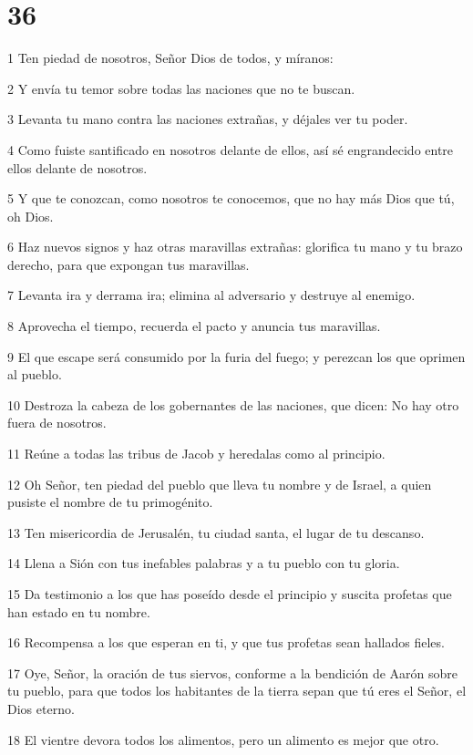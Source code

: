 \chapter{36}

\par 1 Ten piedad de nosotros, Señor Dios de todos, y míranos:
\par 2 Y envía tu temor sobre todas las naciones que no te buscan.
\par 3 Levanta tu mano contra las naciones extrañas, y déjales ver tu poder.
\par 4 Como fuiste santificado en nosotros delante de ellos, así sé engrandecido entre ellos delante de nosotros.
\par 5 Y que te conozcan, como nosotros te conocemos, que no hay más Dios que tú, oh Dios.
\par 6 Haz nuevos signos y haz otras maravillas extrañas: glorifica tu mano y tu brazo derecho, para que expongan tus maravillas.
\par 7 Levanta ira y derrama ira; elimina al adversario y destruye al enemigo.
\par 8 Aprovecha el tiempo, recuerda el pacto y anuncia tus maravillas.
\par 9 El que escape será consumido por la furia del fuego; y perezcan los que oprimen al pueblo.
\par 10 Destroza la cabeza de los gobernantes de las naciones, que dicen: No hay otro fuera de nosotros.
\par 11 Reúne a todas las tribus de Jacob y heredalas como al principio.
\par 12 Oh Señor, ten piedad del pueblo que lleva tu nombre y de Israel, a quien pusiste el nombre de tu primogénito.
\par 13 Ten misericordia de Jerusalén, tu ciudad santa, el lugar de tu descanso.
\par 14 Llena a Sión con tus inefables palabras y a tu pueblo con tu gloria.
\par 15 Da testimonio a los que has poseído desde el principio y suscita profetas que han estado en tu nombre.
\par 16 Recompensa a los que esperan en ti, y que tus profetas sean hallados fieles.
\par 17 Oye, Señor, la oración de tus siervos, conforme a la bendición de Aarón sobre tu pueblo, para que todos los habitantes de la tierra sepan que tú eres el Señor, el Dios eterno.
\par 18 El vientre devora todos los alimentos, pero un alimento es mejor que otro.
